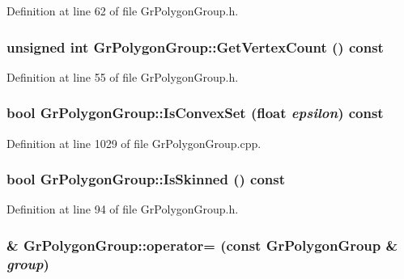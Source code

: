 Definition at line 62 of file GrPolygonGroup.h.\hypertarget{class_gr_polygon_group_c8abcd749d8ba99fca070795ca770b2b}{
\subsubsection[{GetVertexCount}]{\setlength{\rightskip}{0pt plus 5cm}unsigned int GrPolygonGroup::GetVertexCount () const}}
\label{class_gr_polygon_group_c8abcd749d8ba99fca070795ca770b2b}




Definition at line 55 of file GrPolygonGroup.h.\hypertarget{class_gr_polygon_group_d158b0569c3feb64ba0bc71091eb3605}{
\subsubsection[{IsConvexSet}]{\setlength{\rightskip}{0pt plus 5cm}bool GrPolygonGroup::IsConvexSet (float {\em epsilon}) const}}
\label{class_gr_polygon_group_d158b0569c3feb64ba0bc71091eb3605}




Definition at line 1029 of file GrPolygonGroup.cpp.\hypertarget{class_gr_polygon_group_021374f6a34f0df6d401a8bcfde8c30b}{
\subsubsection[{IsSkinned}]{\setlength{\rightskip}{0pt plus 5cm}bool GrPolygonGroup::IsSkinned () const}}
\label{class_gr_polygon_group_021374f6a34f0df6d401a8bcfde8c30b}




Definition at line 94 of file GrPolygonGroup.h.\hypertarget{class_gr_polygon_group_8142b681cb13a758fa82422c13506f00}{
\subsubsection[{operator=}]{\& GrPolygonGroup::operator= (const {\bf GrPolygonGroup} \& {\em group})}}
\label{class_gr_polygon_group_8142b681cb13a758fa82422c13506f00}




